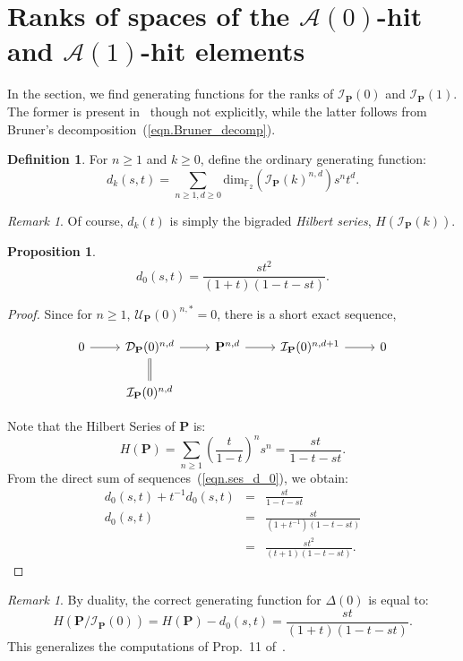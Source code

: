 \documentclass{amsart}
\theoremstyle{plain}
\newtheorem{proposition}[theorem]{Proposition}
\theoremstyle{definition}
\newtheorem{definition}[theorem]{Definition}
\theoremstyle{remark}
\newtheorem{remark}[theorem]{Remark}
\begin{document}
\section{Ranks of spaces of the $\mathcal{A}(0)$-hit and $\mathcal{A}(1)$-hit elements}

In the section, we find generating functions for the ranks of
$\mathcal{I}_{\mathbf{P}}(0)$ and $\mathcal{I}_{\mathbf{P}}(1)$.  The
former is present in~\cite{A2} though not explicitly, while the latter
follows from Bruner's decomposition~(\ref{eqn.Bruner_decomp}).
\begin{definition}
  For $n \geq 1$ and $k \geq 0$, define the ordinary generating
  function:
  \[
    d_{k}(s,t) = \sum_{n \geq 1, d \geq 0} \mathrm{dim}_{{\mathbb{F}}_2}(
    \mathcal{I}_{\mathbf{P}}(k)^{n,d} )s^nt^d.
  \]
\end{definition}
\begin{remark}
  Of course, $d_{k}(t)$ is simply the bigraded {\it Hilbert series},
  $H\left(\mathcal{I}_{\mathbf{P}}(k)\right)$.
\end{remark}
\begin{proposition}
  \[
    d_{0}(s,t) = \frac{st^2}{(1+t)(1-t-st)}.
  \]
\end{proposition}
\begin{proof}
  Since for $n \geq 1$, $\mathcal{U}_{\mathbf{P}}(0)^{n,*} = 0$, there
  is a short exact sequence,
  \begin{center}
    \begin{equation}\label{eqn.ses_d_0}
      \begin{tikzcd}
        0 \rar & \mathcal{D}_{\mathbf{P}}(0)^{n,d} \rar
        \arrow[equals]{d} & \mathbf{P}^{n,d} \rar &
        \mathcal{I}_{\mathbf{P}}(0)^{n,d+1} \rar & 0 \\
        &
        \mathcal{I}_{\mathbf{P}}(0)^{n,d} 
      \end{tikzcd}
    \end{equation}
  \end{center}
  Note that the Hilbert Series of $\mathbf{P}$ is:
  \[
    H(\mathbf{P}) = \sum_{n \geq 1} \left(\frac{t}{1-t}\right)^ns^n
    = \frac{st}{1-t-st}.
  \]
  From the direct sum of sequences~(\ref{eqn.ses_d_0}), we obtain:
  \begin{eqnarray*}
    d_0(s,t) + t^{-1} d_0(s,t) &=& \frac{st}{1-t-st} \\ d_0(s,t) &=&
    \frac{st}{(1+t^{-1})(1-t-st)} \\&=& \frac{st^2}{(t+1)(1-t-st)}.
  \end{eqnarray*}
\end{proof}
\begin{remark}
  By duality, the correct generating function for $\Delta(0)$ is equal
  to:
  \[
    H\left(\mathbf{P}/ \mathcal{I}_{\mathbf{P}}(0)\right)=
    H\left(\mathbf{P}\right) - d_{0}(s,t) = \frac{st}{(1+t)(1-t-st)}.
  \]
  This generalizes the computations of Prop.~11 of~\cite{A2}.
\end{remark}
\end{document}
